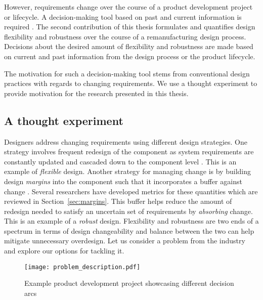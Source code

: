 However, requirements change over the course of a product development project or life\-cycle. A decision-making tool based on past and current information is required \cite{Eckert2019}. The second contribution of this thesis formulates and quantifies design flexibility and robustness over the course of a remanufacturing design process. Decisions about the desired amount of flexibility and robustness are made based on current and past information from the design process or the product lifecycle.

The motivation for such a decision-making tool stems from conventional design practices with regards to changing requirements. We use a thought experiment to provide motivation for the research presented in this thesis.

\subsection{A thought experiment} \label{subsec:thoughtexperiment}

Designers address changing requirements using different design strategies. One strat\-egy involves frequent redesign of the component as system requirements are constantly updated and cascaded down to the component level \cite{Eckert2004}. This is an example of \textit{flexible} design. Another strategy for managing change is by building design \textit{margins} into the component such that it incorporates a buffer against change \cite{Clarkson2004,Eckert2004}. Several researchers have developed metrics for these quantities which are reviewed in Section~\ref{sec:margins}. This buffer helps reduce the amount of redesign needed to satisfy an uncertain set of requirements by \textit{absorbing} change. This is an example of a \textit{robust} design. Flexibility and robustness are two ends of a spectrum in terms of design changeability and balance between the two can help mitigate unnecessary overdesign. Let us consider a problem from the industry and explore our options for tackling it.

\begin{figure}[h!]
	\centering
	\texttt{[image: problem\_description.pdf]}
	\caption{Example product development project showcasing different decision arcs}
	\label{fig:problemdescription}
\end{figure}

